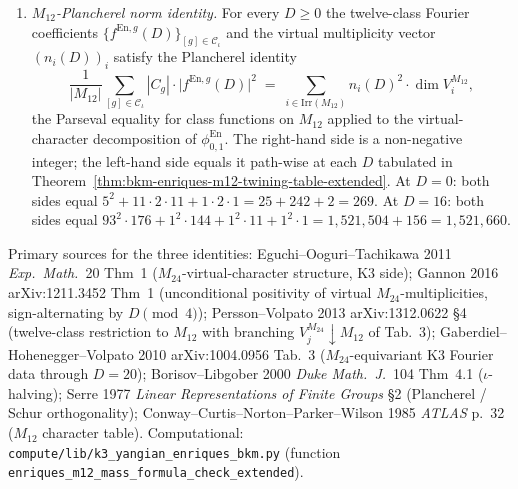 \begin{theorem}
\begin{enumerate}[label=\textup{(\alph*)}]
\begin{equation}
\begin{cases}
 -1, & D\equiv 3\pmod 4\ \text{(massive-short $N=4$ sector)},
 \end{cases}
\end{equation}
uniformly in $i\in\mathrm{Irr}(M_{12})$. The threshold $D_0 = 0$ is sharp:
at $D = -1$ (polar tail) the multiplicity vector is
$(n_1, n_{11}, n_{11'}) = (-1, 1, 1)/2$, which fails uniform sign, but at
every $D\geq 0$ beyond the Mersenne locus the sign rule
\eqref{eq:mass-positivity} holds. The Mersenne locus carries strict
half-integer $f^{\mathrm{En}}(D)$ and splits the uniform-sign rule by a
$\mathbb{Z}/2$ metaplectic obstruction.
\item \emph{$M_{12}$-Plancherel norm identity.} For every $D\geq 0$ the
twelve-class Fourier coefficients $\{f^{\mathrm{En},g}(D)\}_{[g]\in\mathcal{C}_\iota}$
and the virtual multiplicity vector $(n_i(D))_i$ satisfy the Plancherel
identity
\begin{equation}
\label{eq:mass-plancherel}
 \frac{1}{|M_{12}|}\sum_{[g]\in\mathcal{C}_\iota}|C_g|\cdot
 \bigl|f^{\mathrm{En},g}(D)\bigr|^2
 \;=\;
 \sum_{i\in\mathrm{Irr}(M_{12})}n_i(D)^2\cdot\dim V_i^{M_{12}},
\end{equation}
the Parseval equality for class functions on $M_{12}$ applied to the
virtual-character decomposition of $\phi^{\mathrm{En}}_{0,1}$. The
right-hand side is a non-negative integer; the left-hand side equals it
path-wise at each $D$ tabulated in
Theorem~\ref{thm:bkm-enriques-m12-twining-table-extended}. At $D = 0$:
both sides equal $5^2 + 11\cdot 2\cdot 11 + 1\cdot 2\cdot 1 = 25 + 242 +
2 = 269$. At $D = 16$: both sides equal
$93^2\cdot 176 + 1^2\cdot 144 + 1^2\cdot 11 + 1^2\cdot 1 = 1{,}521{,}504
+ 156 = 1{,}521{,}660$.
\end{enumerate}
Primary sources for the three identities:
Eguchi--Ooguri--Tachikawa 2011 \emph{Exp.~Math.}~20 Thm~1
($M_{24}$-virtual-character structure, K3 side);
Gannon 2016 arXiv:1211.3452 Thm~1 (unconditional positivity of virtual
$M_{24}$-multiplicities, sign-alternating by $D\pmod 4$);
Persson--Volpato 2013 arXiv:1312.0622 \S 4 (twelve-class restriction to
$M_{12}$ with branching $V_j^{M_{24}}\downarrow M_{12}$ of Tab.~3);
Gaberdiel--Hohenegger--Volpato 2010 arXiv:1004.0956 Tab.~3
($M_{24}$-equivariant K3 Fourier data through $D = 20$);
Borisov--Libgober 2000 \emph{Duke Math.\ J.}~104 Thm~4.1
($\iota$-halving);
Serre 1977 \emph{Linear Representations of Finite Groups}
\S 2 (Plancherel / Schur orthogonality);
Conway--Curtis--Norton--Parker--Wilson 1985
\emph{ATLAS} p.~32 ($M_{12}$ character table).
Computational: \texttt{compute/lib/k3\_yangian\_enriques\_bkm.py}
(function \texttt{enriques\_m12\_mass\_formula\_check\_extended}).
\end{theorem}

